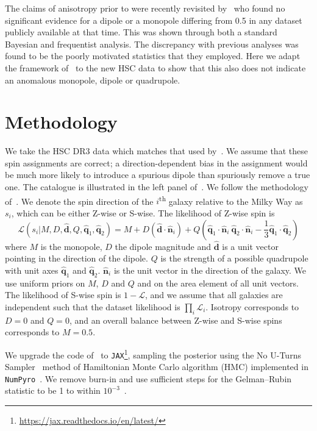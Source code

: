 \documentclass{aastex631}
\begin{document}
The claims of anisotropy prior to \citet{Shamir_2024} were recently revisited by~\cite{Patel_2024} who found no significant evidence for a dipole or a monopole differing from 0.5 in any dataset publicly available at that time. This was shown through both a standard Bayesian and frequentist analysis. The discrepancy with previous analyses was found to be the poorly motivated statistics that they employed. Here we adapt the framework of~\citeauthor{Patel_2024} to the new HSC data to show that this also does not indicate an anomalous monopole, dipole or quadrupole.


\section{Methodology}\label{sec:methodology}

We take the HSC DR3 data which matches that used by~\citet{Shamir_2024}. We assume that these spin assignments are correct; a direction-dependent bias in the assignment would be much more likely to introduce a spurious dipole than spuriously remove a true one. The catalogue is illustrated in the left panel of~. We follow the methodology of~\citeauthor{Patel_2024}. We denote the spin direction of the $i$\textsuperscript{th} galaxy relative to the Milky Way as $s_i$, which can be either Z-wise or S-wise. The likelihood of Z-wise spin is
\begin{equation}
    \mathcal{L}(s_i | M, D, \hat{\bm{d}}, Q, \hat{\bm{q}}_1, \hat{\bm{q}}_2)
    = M
    + D\left(\hat{\bm{d}} \cdot \hat{\bm{n}}_i\right)
    + Q\left(\hat{\bm{q}}_1 \cdot \hat{\bm{n}}_i ~ \hat{\bm{q}}_2 \cdot \hat{\bm{n}}_i - \frac{1}{3}\hat{\bm{q}}_1\cdot\hat{\bm{q}}_2\right)
\end{equation}
where $M$ is the monopole, $D$ the dipole magnitude and $\hat{\bm{d}}$ is a unit vector pointing in the direction of the dipole. $Q$ is the strength of a possible quadrupole with unit axes $\hat{\bm{q}}_1$ and $\hat{\bm{q}}_2$. $\hat{\bm{n}}_i$ is the unit vector in the direction of the galaxy. We use uniform priors on $M$, $D$ and $Q$ and on the area element of all unit vectors.  The likelihood of S-wise spin is $1 - \mathcal{L}$, and we assume that all galaxies are independent such that the dataset likelihood is $\prod_i \mathcal{L}_i$. Isotropy corresponds to $D = 0$ and $Q = 0$, and an overall balance between Z-wise and S-wise spins corresponds to $M = 0.5$.

We upgrade the code of~\citeauthor{Patel_2024} to \texttt{JAX}\footnote{\url{https://jax.readthedocs.io/en/latest/}}, sampling the posterior using the No U-Turns Sampler~\citep{Hoffman_2011} method of Hamiltonian Monte Carlo algorithm (HMC) implemented in \texttt{NumPyro}~\citep{Phan_2019}. We remove burn-in and use sufficient steps for the Gelman--Rubin statistic to be 1 to within $10^{-3}$~\citep{Gelman_1992}.
\end{document}
